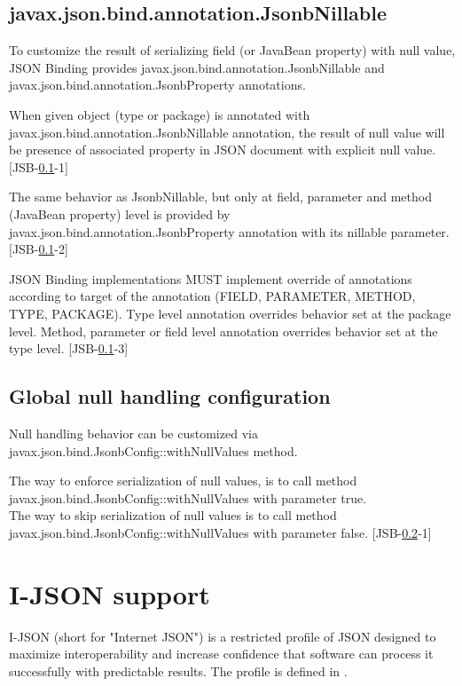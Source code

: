 \subsection{javax.json.bind.annotation.JsonbNillable}
\label{subsec:JsonbNillable}

To customize the result of serializing field (or JavaBean property) with null value, JSON Binding provides javax.json.bind.annotation.JsonbNillable and javax.json.bind.annotation.JsonbProperty annotations.

When given object (type or package) is annotated with javax.json.bind.annotation.JsonbNillable annotation, the result of null value will be presence of associated property in JSON document with explicit null value. [JSB-\ref{subsec:JsonbNillable}-1]

The same behavior as JsonbNillable, but only at field, parameter and method (JavaBean property) level is provided by javax.json.bind.annotation.JsonbProperty annotation with its nillable parameter. [JSB-\ref{subsec:JsonbNillable}-2]

JSON Binding implementations MUST implement override of annotations according to target of the annotation (FIELD, PARAMETER, METHOD, TYPE, PACKAGE). Type level annotation overrides behavior set at the package level. Method, parameter or field level annotation overrides behavior set at the type level. [JSB-\ref{subsec:JsonbNillable}-3]

\subsection{Global null handling configuration}
\label{subsec:NullSerializationPolicy}

Null handling behavior can be customized via javax.json.bind.JsonbConfig::withNullValues method.

The way to enforce serialization of null values, is to call method javax.json.bind.JsonbConfig::withNullValues with parameter true. \\
The way to skip serialization of null values is to call method javax.json.bind.JsonbConfig::withNullValues with parameter false. [JSB-\ref{subsec:NullSerializationPolicy}-1]

\section{I-JSON support}
\label{sec:i_json}

I-JSON (short for "Internet JSON") is a restricted profile of JSON designed to maximize interoperability and increase confidence that software can process it successfully with predictable results. The profile is defined in \cite{rfc7159}.

